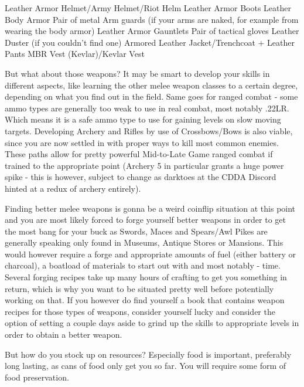 \documentclass[11pt]{report}
\begin{document}
Leather Armor Helmet/Army Helmet/Riot Helm
Leather Armor Boots
Leather Body Armor
Pair of metal Arm guards (if your arms are naked, for example from wearing the body armor)
Leather Armor Gauntlets
Pair of tactical gloves
Leather Duster (if you couldn't find one)
Armored Leather Jacket/Trenchcoat + Leather Pants
MBR Vest (Kevlar)/Kevlar Vest

But what about those weapons? It may be smart to develop your skills in different aspects, like learning the other melee weapon classes to a certain degree, depending on what you find out in the field. Same goes for ranged combat - some ammo types are generally too weak to use in real combat, most notably .22LR. Which means it is a safe ammo type to use for gaining levels on slow moving targets. Developing Archery and Rifles by use of Crossbows/Bows is also viable, since you are now settled in with proper ways to kill most common enemies. These paths allow for pretty powerful Mid-to-Late Game ranged combat if trained to the appropriate point (Archery 5 in particular grants a huge power spike - this is however, subject to change as darktoes at the CDDA Discord hinted at a redux of archery entirely).

Finding better melee weapons is gonna be a weird coinflip situation at this point and you are most likely forced to forge yourself better weapons in order to get the most bang for your buck as Swords, Maces and Spears/Awl Pikes are generally speaking only found in Museums, Antique Stores or Mansions. This would however require a forge and appropriate amounts of fuel (either battery or charcoal), a boatload of materials to start out with and most notably - time. Several forging recipes take up many hours of crafting to get you something in return, which is why you want to be situated pretty well before potentially working on that. If you however do find yourself a book that contains weapon recipes for those types of weapons, consider yourself lucky and consider the option of setting a couple days aside to grind up the skills to appropriate levels in order to obtain a better weapon.

But how do you stock up on resources? Especially food is important, preferably long lasting, as cans of food only get you so far. You will require some form of food preservation.
\end{document}
